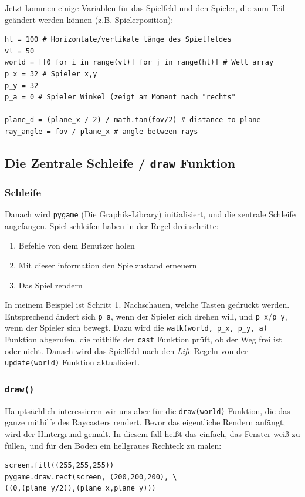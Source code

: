 \documentclass[a4paper,12pt]{report}
\begin{document}
Jetzt kommen einige Variablen für das Spielfeld und den Spieler, die zum Teil geändert werden können (z.B. Spielerposition):
\begin{Verbatim}[baselinestretch=1.0, xleftmargin=1cm]
hl = 100 # Horizontale/vertikale länge des Spielfeldes
vl = 50
world = [[0 for i in range(vl)] for j in range(hl)] # Welt array
p_x = 32 # Spieler x,y
p_y = 32
p_a = 0 # Spieler Winkel (zeigt am Moment nach "rechts"

plane_d = (plane_x / 2) / math.tan(fov/2) # distance to plane
ray_angle = fov / plane_x # angle between rays
\end{Verbatim}

\subsection{Die Zentrale Schleife / \texttt{draw} Funktion}
\subsubsection{Schleife}
Danach wird \texttt{pygame} (Die Graphik-Library) initialisiert, und die zentrale Schleife angefangen. Spiel-schleifen haben in der Regel drei schritte:
\begin{enumerate}
	\item Befehle von dem Benutzer holen
	\item Mit dieser information den Spielzustand erneuern
	\item Das Spiel rendern
\end{enumerate}
In meinem Beispiel ist Schritt 1. Nachschauen, welche Tasten gedr\"uckt werden. Entsprechend ändert sich \texttt{p\_a}, wenn der Spieler sich drehen will, und \texttt{p\_x}/\texttt{p\_y}, wenn der Spieler sich bewegt. Dazu wird die \texttt{walk(world, p\_x, p\_y, a)} Funktion abgerufen, die mithilfe der \texttt{cast} Funktion prüft, ob der Weg frei ist oder nicht. Danach wird das Spielfeld nach den \textit{Life}-Regeln von der \texttt{update(world)} Funktion aktualisiert.

\subsubsection{\texttt{draw()}}
Hauptsächlich interessieren wir uns aber für die \texttt{draw(world)} Funktion, die das ganze mithilfe des Raycasters rendert. Bevor das eigentliche Rendern anfängt, wird der Hintergrund gemalt. In diesem fall heißt das einfach, das Fenster weiß zu füllen, und für den Boden ein hellgraues Rechteck zu malen:
\begin{Verbatim}[baselinestretch=1.0, xleftmargin=1cm]
screen.fill((255,255,255))
pygame.draw.rect(screen, (200,200,200), \
((0,(plane_y/2)),(plane_x,plane_y)))
\end{Verbatim}
\end{document}
